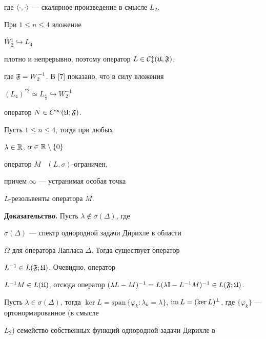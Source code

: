 где $\langle\cdot,\cdot\rangle$ --- скалярное произведение в смысле $L_{2}$.


При $1\leq n\leq4$ вложение


$\overset{\circ}{W}{}^{1}_{2}\hookrightarrow L_{4}$


плотно и непрерывно, поэтому оператор $L\in \cal C l(\frak U,\frak F)$,


где $\frak F=W^{-1}_{2}$. В [7] показано, что в силу вложения


$(L_{4})^{*2}\simeq L_{\frac{4}{3}}\hookrightarrow W^{-1}_{2}$


оператор $N\in C^{\infty}(\frak U;\frak F)$.








\begin{lems}


Пусть $1\leq n\leq4$, тогда при любых


$\lambda\in\Bbb R$, $\alpha\in\Bbb R\setminus\{0\}$ 


оператор $M$ \ $(L,\sigma)$-огра\-ничен, 


причем $\infty$ --- устранимая особая точка


$L$-резольвенты оператора $M$.


\end{lems}








{\bf Доказательство.} Пусть $\lambda\notin\sigma(\Delta)$, где


$\sigma(\Delta)$ --- спектр однородной задачи Дирихле в области


$\Omega$ для оператора Лапласа $\Delta$. Тогда существует оператор


$L^{-1}\in L(\frak F;\frak U)$. Очевидно, оператор


$L^{-1}M\in L(\frak U)$, отсюда оператор $(\lambda


L-M)^{-1}=L(\lambda\Bbb I-L^{-1}M)^{-1}\in L(\frak F;\frak U)$.





Пусть $\lambda\in\sigma(\Delta)$, тогда $\ker L=


\mathrm{span}\,\{\varphi_{k}: \lambda_{k}=\lambda\}$, $\im L=(\ker


L)^{\perp}$, где $\{\varphi_{k}\}$ --- ортонормированное (в смысле


$L_{2}$) семейство собственных функций однородной задачи Дирихле в


